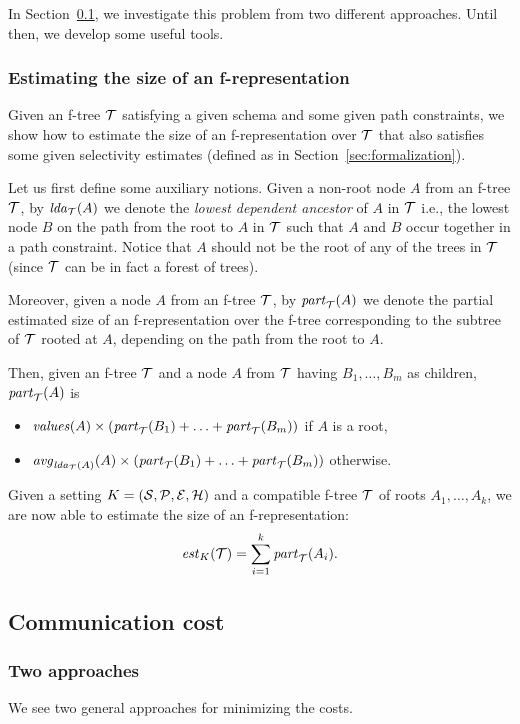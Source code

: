 In Section~\ref{sec:communication:cost}, we investigate this problem from two different approaches.
Until then, we develop some useful tools.


\subsubsection{Estimating the size of an f-representation}\label{sec:compute:estimate}
Given an f-tree $\mathcal T$ satisfying a given schema and some given path constraints, we show how to estimate the size of an f-representation over $\mathcal T$ that also satisfies some given selectivity estimates (defined as in Section~\ref{sec:formalization}).

Let us first define some auxiliary notions.
Given a non-root node $A$ from an f-tree $\mathcal T$, by $\mathit{lda}_\mathcal T(A)$ we denote the {\em lowest dependent ancestor} of $A$ in $\mathcal T$ i.e., the lowest node $B$ on the path from the root to $A$ in $\mathcal T$ such that $A$ and $B$ occur together in a path constraint.
Notice that $A$ should not be the root of any of the trees in $\mathcal T$ (since $\mathcal T$ can be in fact a forest of trees).

Moreover, given a node $A$ from an f-tree $\mathcal T$, by $\mathit{part}_\mathcal T(A)$ we denote the partial estimated size of an f-representation over the f-tree corresponding to the subtree of $\mathcal T$ rooted at $A$, depending on the path from the root to $A$.

Then, given an f-tree $\mathcal T$ and a node $A$ from $\mathcal T$ having $B_1,\ldots, B_m$ as children, $\mathit{part}_\mathcal T(A)$ is

\begin{itemize}
\item $\mathit{values}(A)\times(\mathit{part}_\mathcal T(B_1) + \ldots + \mathit{part}_\mathcal T(B_m))$ if $A$ is a root,
\item $\mathit{avg}_{\mathit{lda}_{\mathcal T}(A)}(A) \times(\mathit{part}_\mathcal T(B_1) + \ldots + \mathit{part}_\mathcal T(B_m))$ otherwise.
\end{itemize}
Given a setting $K=(\mathcal S,\mathcal P,\mathcal E,\mathcal{H})$ and a compatible f-tree $\mathcal T$ of roots $A_1,\ldots,A_k$, we are now able to estimate the size of an f-representation:
\[
\mathit{est}_K(\mathcal T) = \sum_{i=1}^k \mathit{part}_\mathcal T(A_i).
\]



\subsection{Communication cost}\label{sec:communication:cost}


\subsubsection{Two approaches}
We see two general approaches for minimizing the costs.

